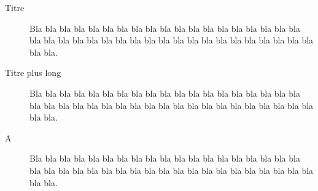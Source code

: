 \documentclass{article}
\begin{document}
\begin{description}
	\item[Titre] Bla bla bla bla bla bla bla bla bla bla bla bla bla bla bla bla bla bla bla
	bla bla bla bla bla bla bla bla bla bla bla bla bla bla bla bla bla bla bla bla bla bla.

	\item[Titre plus long] Bla bla bla bla bla bla bla bla bla bla bla bla bla bla bla bla bla bla
	bla bla bla bla bla bla bla bla bla bla bla bla bla bla bla bla bla bla bla bla bla bla bla.

	\item[A] Bla bla bla bla bla bla bla bla bla bla bla bla bla bla bla bla bla bla bla
	bla bla bla bla bla bla bla bla bla bla bla bla bla bla bla bla bla bla bla bla bla bla.
\end{description}
\end{document}
